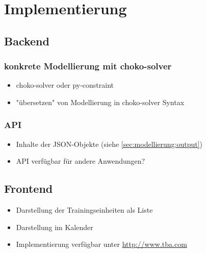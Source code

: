 \chapter{Implementierung}
\label{sec:implementierung} 
\section{Backend}
\subsection{konkrete Modellierung mit choko-solver}
\begin{itemize}
    \item choko-solver oder py-constraint
    \item "übersetzen" von Modellierung in choko-solver Syntax
\end{itemize}

\subsection{API}
\begin{itemize}
    \item Inhalte der JSON-Objekte (siehe \ref{sec:modellierung:output})
    \item API verfügbar für andere Anwendungen?
\end{itemize}

\section{Frontend}
\begin{itemize}
    \item Darstellung der Trainingseinheiten als Liste
    \item Darstellung im Kalender  
    \item Implementierung verfügbar unter \url{http://www.tba.com}
\end{itemize}
